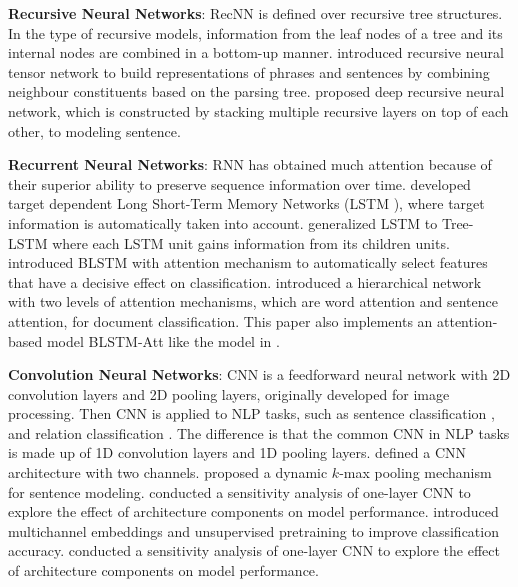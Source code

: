 \documentclass[11pt]{article}
\begin{document}
\textbf{Recursive Neural Networks}: RecNN is defined over recursive tree structures. In the type of recursive models, information from the leaf nodes of a tree and its internal nodes are combined in a bottom-up manner.  introduced recursive neural tensor network to build representations of phrases and sentences by combining neighbour constituents based on the parsing tree.  proposed deep recursive neural network, which is constructed by stacking multiple recursive layers on top of each other, to modeling sentence.



\textbf{Recurrent Neural Networks}: RNN has obtained much attention because of their superior ability to preserve sequence information over time.  developed target dependent Long Short-Term Memory Networks (LSTM \cite{hochreiter1997long}), where target information is automatically taken into account.  generalized  LSTM to Tree-LSTM where each LSTM unit gains information from its children units.  introduced BLSTM with attention mechanism to automatically select features that have a decisive effect on classification.  introduced a hierarchical network with two levels of attention mechanisms, which are word attention and sentence attention, for document classification. This paper also implements an attention-based model BLSTM-Att like the model in .






\textbf{Convolution Neural Networks}: CNN \cite{lecun1998gradient} is a feedforward neural network with 2D convolution layers and 2D pooling layers, originally developed for image processing. Then CNN is applied to NLP tasks, such as sentence classification \cite{kalchbrenner2014convolutional,kim2014convolutional}, and relation classification \cite{zeng2014relation}. The difference is that the common CNN in NLP tasks is made up of 1D convolution layers and 1D pooling layers.  defined a CNN architecture with two channels.  proposed a dynamic $k$-max pooling mechanism for sentence modeling. \cite{zhang2015sensitivity} conducted a sensitivity analysis of one-layer CNN to explore the effect of architecture components on model performance.  introduced multichannel embeddings and unsupervised pretraining to improve classification accuracy. \cite{zhang2015sensitivity} conducted a sensitivity analysis of one-layer CNN to explore the effect of architecture components on model performance.
\end{document}
